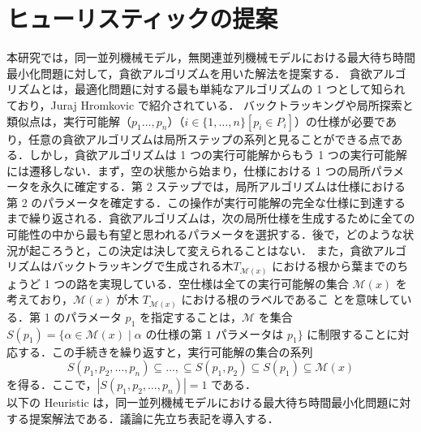\documentclass[12pt]{optlab-bachelor}
\begin{document}
\section{ヒューリスティックの提案}\label{5_s_2}
本研究では，同一並列機械モデル，無関連並列機械モデルにおける最大待ち時間最小化問題に対して，貪欲アルゴリズムを用いた解法を提案する．
貪欲アルゴリズムとは，最適化問題に対する最も単純なアルゴリズムの 1 つとして知られており，Juraj Hromkovic \cite{greedy} で紹介されている．
バックトラッキングや局所探索と類似点は，実行可能解（$p_1\ldots,p_n$）（$i \in \{1,\ldots,n\}[p_i \in P_i]$）の仕様が必要であり，任意の貪欲アルゴリズムは局所ステップの系列と見ることができる点である．しかし，貪欲アルゴリズムは 1 つの実行可能解からもう 1 つの実行可能解には遷移しない．まず，空の状態から始まり，仕様における 1 つの局所パラメータを永久に確定する．第 2 ステップでは，局所アルゴリズムは仕様における第 2 のパラメータを確定する．この操作が実行可能解の完全な仕様に到達するまで繰り返される．貪欲アルゴリズムは，次の局所仕様を生成するために全ての可能性の中から最も有望と思われるパラメータを選択する．後で，どのような状況が起ころうと，この決定は決して変えられることはない．
また，貪欲アルゴリズムはバックトラッキングで生成される木$T_{\mathcal{M}(x)}$ における根から葉までのちょうど 1 つの路を実現している．空仕様は全ての実行可能解の集合 $\mathcal{M}(x)$ を考えており，$\mathcal{M}(x)$ が木 $T_{\mathcal{M}(x)}$ における根のラベルであるこ
とを意味している．第 1 のパラメータ $p_1$ を指定することは，$\mathcal{M}$ を集合 $S(p_1) = \{\alpha \in \mathcal{M}(x) \mid \alpha \text{ の仕様の第 1 パラメータは } p_1\}$ に制限することに対応する．この手続きを繰り返すと，実行可能解の集合の系列
\begin{displaymath}
  S(p_1,p_2,\ldots,p_n) \subseteq \ldots, \subseteq S(p_1,p_2) \subseteq S(p_1) \subseteq \mathcal{M}(x)
\end{displaymath}
を得る．ここで，$|S(p_1,p_2,\ldots,p_n)| = 1$ である．\\

\noindent 以下の {\sc Heuristic} は，同一並列機械モデルにおける最大待ち時間最小化問題に対する提案解法である．議論に先立ち表記を導入する．
\end{document}
